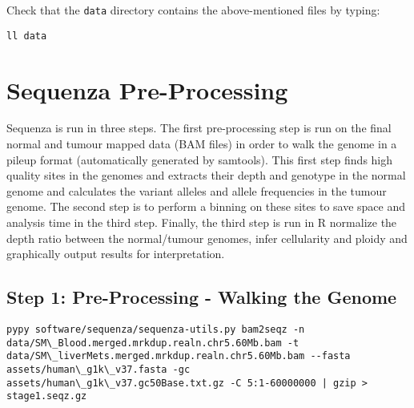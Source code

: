 \begin{steps}
Check that the \texttt{data} directory contains the above-mentioned files by typing:
\begin{lstlisting}
ll data
\end{lstlisting}
\end{steps}



\section{Sequenza Pre-Processing}

Sequenza is run in three steps. The first pre-processing step is run on the final normal and tumour mapped data (BAM files) in order to walk the genome in a pileup format (automatically generated by samtools). This first step finds high quality sites in the genomes and extracts their depth and genotype in the normal genome and calculates the variant alleles and allele frequencies in the tumour genome. The second step is to perform a binning on these sites to save space and analysis time in the third step. Finally, the third step is run in R normalize the depth ratio between the normal/tumour genomes, infer cellularity and ploidy and graphically output results for interpretation.


\subsection{Step 1: Pre-Processing - Walking the Genome}

\begin{steps}
\begin{lstlisting}
pypy software/sequenza/sequenza-utils.py bam2seqz -n data/SM\_Blood.merged.mrkdup.realn.chr5.60Mb.bam -t data/SM\_liverMets.merged.mrkdup.realn.chr5.60Mb.bam --fasta assets/human\_g1k\_v37.fasta -gc assets/human\_g1k\_v37.gc50Base.txt.gz -C 5:1-60000000 | gzip > stage1.seqz.gz
\end{lstlisting}
\end{steps}

